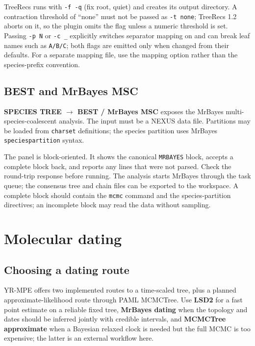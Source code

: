\documentclass[10pt]{report}
\begin{document}
TreeRecs runs with \texttt{-f -q} (fix root, quiet) and creates its output
directory. A contraction threshold of ``none'' must not be passed as
\texttt{-t none}; TreeRecs 1.2 aborts on it, so the plugin omits the flag
unless a numeric threshold is set. Passing \texttt{-p N} or \texttt{-c \_}
explicitly switches separator mapping on and can break leaf names such as
\texttt{A/B/C}; both flags are emitted only when changed from their defaults.
For a separate mapping file, use the mapping option rather than the
species-prefix convention.

\section{BEST and MrBayes MSC}

\textbf{SPECIES TREE $\rightarrow$ BEST / MrBayes MSC} exposes the MrBayes
multi-species-coalescent analysis. The input must be a NEXUS data file.
Partitions may be loaded from \texttt{charset} definitions; the species
partition uses MrBayes \texttt{speciespartition} syntax.

The panel is block-oriented. It shows the canonical \texttt{MRBAYES} block,
accepts a complete block back, and reports any lines that were not parsed.
Check the round-trip response before running. The analysis starts MrBayes
through the task queue; the consensus tree and chain files can be exported to
the workspace. A complete block should contain the \texttt{mcmc} command and
the species-partition directives; an incomplete block may read the data without
sampling.

\chapter{Molecular dating}

\section{Choosing a dating route}

YR-MPE offers two implemented routes to a time-scaled tree, plus a planned
approximate-likelihood route through PAML MCMCTree. Use \textbf{LSD2} for a
fast point estimate on a reliable fixed tree, \textbf{MrBayes dating} when the
topology and dates should be inferred jointly with credible intervals, and
\textbf{MCMCTree approximate} when a Bayesian relaxed clock is needed but the
full MCMC is too expensive; the latter is an external workflow here.
\end{document}
